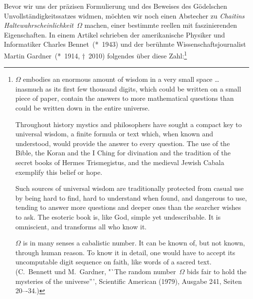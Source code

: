 \documentclass[twoside]{../zirkelblatt1415}
\theoremstyle{definition}
\theoremstyle{plain}
\theoremstyle{remark}
\begin{document}
Bevor wir uns der präzisen Formulierung und des Beweises des Gödelschen
Unvollständigkeitssatzes widmen, möchten wir noch einen Abstecher zu
\emph{Chaitins Haltewahrscheinlichkeit}~$\Omega$ machen, einer bestimmte
reellen mit faszinierenden Eigenschaften. In einem Artikel schrieben der
amerikanische Physiker und Informatiker Charles Bennet~(*~1943) und der
berühmte Wissenschaftsjournalist Martin Gardner~(*~1914, †~2010) folgendes über
diese Zahl:\footnote{$\Omega$ embodies an enormous amount of wisdom in a very
small space \ldots{} inasmuch as its first few thousand digits, which could be
written on a small piece of paper, contain the answers to more mathematical
questions than could be written down in the entire universe.

Throughout history mystics and philosophers have sought a compact
key to universal wisdom, a finite formula or text which, when known and
understood, would provide the answer to every question. The use of the Bible,
the Koran and the I Ching for divination and the tradition of the secret
books of Hermes Trismegistus, and the medieval Jewish Cabala exemplify this
belief or hope.

Such sources of universal wisdom are traditionally protected from casual use
by being hard to find, hard to understand when found, and dangerous to use,
tending to answer more questions and deeper ones than the searcher wishes to
ask. The esoteric book is, like God, simple yet undescribable. It is
omniscient, and transforms all who know it.

$\Omega$ is in many senses a cabalistic number. It can be known of, but not
known, through human reason. To know it in detail, one would have to accept
its uncomputable digit sequence on faith, like words of a sacred text.
(C.~Bennett und M.~Gardner, "`The random number~$\Omega$ bids fair to hold
the mysteries of the universe”', Scientific American (1979), Ausgabe 241,
Seiten 20–-34.)}
\end{document}
